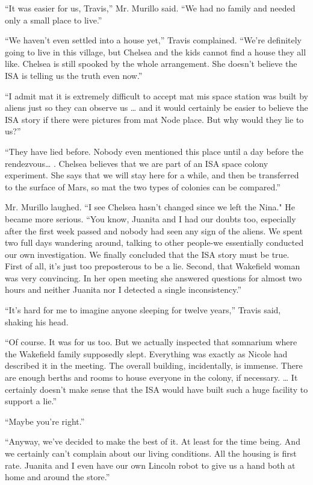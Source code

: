 \documentclass[]{article}
\begin{document}
{“It was easier for us, Travis,” Mr.  Murillo said.  “We had no family and needed only a small place to live.”

“We haven’t even settled into a house yet,” Travis complained.  “We’re definitely going to live in this village, but Chelsea and the kids cannot find a house they all like.  Chelsea is still spooked by the whole arrangement.  She doesn’t believe the ISA is telling us the truth even now.”

“I admit mat it is extremely difficult to accept mat mis space station was built by aliens just so they can observe us … and it would certainly be easier to believe the ISA story if there were pictures from mat Node place.  But why would they lie to us?”

“They have lied before.  Nobody even mentioned this place until a day before the rendezvous… .  Chelsea believes that we are part of an ISA space colony experiment.  She says that we will stay here for a while, and then be transferred to the surface of Mars, so mat the two types of colonies can be compared.”

Mr.  Murillo laughed.  “I see Chelsea hasn’t changed since we left the Nina."  He became more serious.  “You know, Juanita and I had our doubts too, especially after the first week passed and nobody had seen any sign of the aliens.  We spent two full days wandering around, talking to other people-we essentially conducted our own investigation.  We finally concluded that the ISA story must be true.  First of all, it’s just too preposterous to be a lie.  Second, that Wakefield woman was very convincing.  In her open meeting she answered questions for almost two hours and neither Juanita nor I detected a single inconsistency.”

“It’s hard for me to imagine anyone sleeping for twelve years,” Travis said, shaking his head.

“Of course.  It was for us too.  But we actually inspected that somnarium where the Wakefield family supposedly slept.  Everything was exactly as Nicole had described it in the meeting.  The overall building, incidentally, is immense.  There are enough berths and rooms to house everyone in the colony, if necessary.  … It certainly doesn’t make sense that the ISA would have built such a huge facility to support a lie.”

“Maybe you’re right.”

“Anyway, we’ve decided to make the best of it.  At least for the time being.  And we certainly can’t complain about our living conditions.  All the housing is first rate.  Juanita and I even have our own Lincoln robot to give us a hand both at home and around the store.”

}
\end{document}
